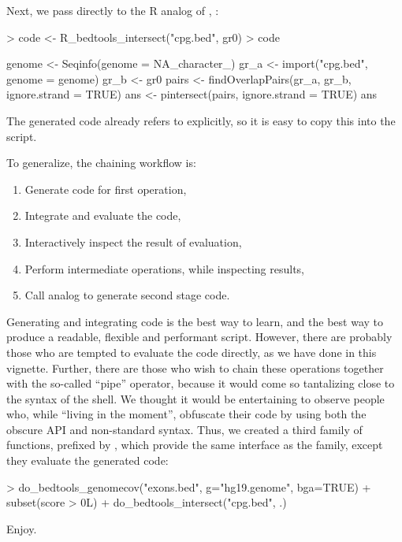 \documentclass[10pt]{article}
\begin{document}
Next, we pass  directly to the R analog of
, :
\begin{Schunk}
\begin{Sinput}
> code <- R_bedtools_intersect("cpg.bed", gr0)
> code
\end{Sinput}
\begin{Soutput}
{
    genome <- Seqinfo(genome = NA_character_)
    gr_a <- import("cpg.bed", genome = genome)
    gr_b <- gr0
    pairs <- findOverlapPairs(gr_a, gr_b, ignore.strand = TRUE)
    ans <- pintersect(pairs, ignore.strand = TRUE)
    ans
}
\end{Soutput}
\end{Schunk}
The generated code already refers to  explicitly, so it
is easy to copy this into the script.

To generalize, the chaining workflow is:
\begin{enumerate}
\item Generate code for first operation,
\item Integrate and evaluate the code,
\item Interactively inspect the result of evaluation,
\item Perform intermediate operations, while inspecting results,
\item Call  analog to generate second stage code.
\end{enumerate}

Generating and integrating \R{} code is the best way to learn, and the
best way to produce a readable, flexible and performant
script. However, there are probably those who are tempted to evaluate
the code directly, as we have done in this vignette. Further, there
are those who wish to chain these operations together with the
so-called ``pipe'' operator, because it would come so tantalizing
close to the syntax of the shell. We thought it would be entertaining
to observe people who, while ``living in the moment'', obfuscate their
code by using both the obscure  API and
non-standard syntax. Thus, we created a third family of functions,
prefixed by , which provide the same interface as the
 family, except they evaluate the generated code:
\begin{Schunk}
\begin{Sinput}
> do_bedtools_genomecov("exons.bed", g="hg19.genome", bga=TRUE) %
+     subset(score > 0L) %
+     do_bedtools_intersect("cpg.bed", .)    
\end{Sinput}
\end{Schunk}
Enjoy.
\end{document}
